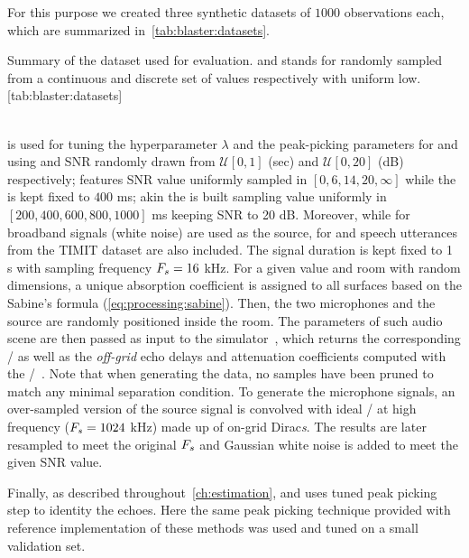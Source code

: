 \mynewline
For this purpose we created three synthetic datasets of $1000$ observations each, which are summarized in~\cref{tab:blaster:datasets}.
\begin{table}[ht]
    \begin{sidecaption}[]{
        Summary of the dataset used for evaluation.  and  stands for randomly sampled from a continuous and discrete set of values respectively with uniform low.
    }[tab:blaster:datasets]
    \centering
    \small
    
    \end{sidecaption}
\end{table}
\\\dsetValid{} is used for tuning the hyperparameter $\lambda$ and the peak-picking parameters for \algoCrocco{} and \algoBsn{} using \RT{} and SNR randomly drawn from $\mathcal{U}[0, 1]$ (sec) and $\mathcal{U}[0, 20]$ (dB) respectively; \dsetSNR{} features SNR value uniformly sampled in $[0, 6, 14, 20, \infty]$ while the \RT{} is kept fixed to $400$ ms; akin the \dsetRT{} is built sampling \RT{} value uniformly in $[200, 400, 600, 800, 1000]$ ms keeping SNR to 20 dB.
Moreover, while for \dsetValid{} broadband signals (white noise) are used as the source, for \dsetSNR{} and \dsetRT{} speech utterances from the TIMIT dataset are also included.
The signal duration is kept fixed to 1 s with sampling frequency $F_s = 16$ kHz.
For a given \RT{} value and room with random dimensions, a unique absorption coefficient is assigned to all surfaces based on the Sabine's formula (\cref{eq:processing:sabine}).
Then, the two microphones and the source are randomly positioned inside the room.
The parameters of such audio scene are then passed as input to the \pyroomacoustics{} simulator~, which returns the corresponding \RIRs/ as well as the \textit{off-grid} echo delays and attenuation coefficients computed with the \ISMdef/~.
Note that when generating the data, no samples have been pruned to match any minimal separation condition.
To generate the microphone signals, an over-sampled version of the source signal is convolved with ideal \RIRs/ at high frequency ($F_s=1024$ kHz) made up of on-grid Dirac\textit{s}.
The results are later resampled to meet the original $F_s$ and Gaussian white noise is added to meet the given SNR value.

\mynewline
Finally, as described throughout~\cref{ch:estimation}, \algoCrocco{} and \algoBsn{} uses tuned peak picking step to identity the echoes.
Here the same peak picking technique provided with reference implementation of these methods was used and tuned on a small validation set.


